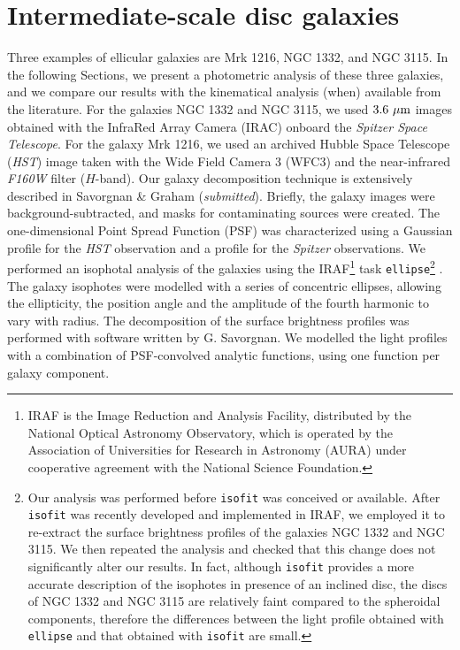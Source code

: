 \documentclass[useAMS,usenatbib,article]{mn2e}
\begin{document}
\section{Intermediate-scale disc galaxies}
\label{sec:gal}
Three examples of ellicular galaxies are Mrk 1216, NGC 1332, and NGC 3115. 
In the following Sections, we present a photometric analysis of these three galaxies, 
and we compare our results with the kinematical analysis (when) available from the literature. 
For the galaxies NGC 1332 and NGC 3115, we used $3.6~\rm \mu m$ images obtained with the InfraRed Array Camera (IRAC) 
onboard the \emph{Spitzer Space Telescope}. 
For the galaxy Mrk 1216, we used an archived Hubble Space Telescope (\emph{HST}) image  
taken with the Wide Field Camera 3 (WFC3) and the near-infrared \emph{F160W} filter ($H$-band). 
Our galaxy decomposition technique is extensively described in Savorgnan \& Graham (\emph{submitted}).
Briefly, the galaxy images were background-subtracted, and masks for contaminating sources were created. 
The one-dimensional Point Spread Function (PSF) was characterized using a Gaussian profile for the \emph{HST} observation 
and a \cite{moffat1969} profile for the \emph{Spitzer} observations.
We performed an isophotal analysis of the galaxies using the IRAF\footnote{IRAF 
is the Image Reduction and Analysis Facility, distributed by the National Optical Astronomy Observatory, 
which is operated by the Association of Universities for Research in Astronomy (AURA) 
under cooperative agreement with the National Science Foundation.} task {\tt ellipse}\footnote{Our analysis 
was performed before {\tt isofit} \citep{ciambur2015} was conceived or available. 
After {\tt isofit} was recently developed and implemented in IRAF, 
we employed it to re-extract the surface brightness profiles of the galaxies NGC 1332 and NGC 3115. 
We then repeated the analysis and checked that this change does not significantly alter our results. 
In fact, although {\tt isofit} provides a more accurate description of the isophotes in presence of an inclined disc, 
the discs of NGC 1332 and NGC 3115 are relatively faint compared to the spheroidal components, 
therefore the differences between the light profile obtained with {\tt ellipse} and that obtained with {\tt isofit} are small. } 
\citep{taskellipse}. 
The galaxy isophotes were modelled with a series of concentric ellipses, 
allowing the ellipticity, the position angle and the amplitude of the fourth harmonic to vary with radius.  
The decomposition of the surface brightness profiles was performed with software written by G. Savorgnan.
We modelled the light profiles with a combination of PSF-convolved analytic functions, 
using one function per galaxy component. 
\end{document}
